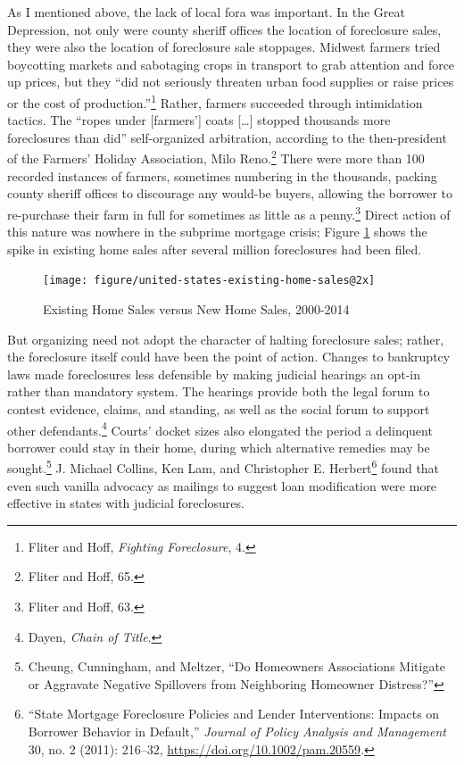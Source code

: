 \documentclass[12pt,oneside]{psthesis}
\begin{document}
As I mentioned above, the lack of local fora was important.
In the Great Depression, not only were county sheriff offices the location of foreclosure sales, they were also the location of foreclosure sale stoppages.
Midwest farmers tried boycotting markets and sabotaging crops in transport to grab attention and force up prices, but they ``did not seriously threaten urban food supplies or raise prices or the cost of production.''\footnote{Fliter and Hoff, \emph{Fighting Foreclosure}, 4.}
Rather, farmers succeeded through intimidation tactics.
The ``ropes under {[}farmers'{]} coats {[}\ldots{]} stopped thousands more foreclosures than did'' self-organized arbitration, according to the then-president of the Farmers' Holiday Association, Milo Reno.\footnote{Fliter and Hoff, 65.}
There were more than 100 recorded instances of farmers, sometimes numbering in the thousands, packing county sheriff offices to discourage any would-be buyers, allowing the borrower to re-purchase their farm in full for sometimes as little as a penny.\footnote{Fliter and Hoff, 63.}
Direct action of this nature was nowhere in the subprime mortgage crisis; Figure \ref{fig:tradingecon} shows the spike in existing home sales after several million foreclosures had been filed.
\begin{figure}

{\centering \texttt{[image: figure/united-states-existing-home-sales@2x]} 

}

\caption{Existing Home Sales versus New Home Sales, 2000-2014}\label{fig:tradingecon}
\end{figure}
But organizing need not adopt the character of halting foreclosure sales; rather, the foreclosure itself could have been the point of action.
Changes to bankruptcy laws made foreclosures less defensible by making judicial hearings an opt-in rather than mandatory system.
The hearings provide both the legal forum to contest evidence, claims, and standing, as well as the social forum to support other defendants.\footnote{Dayen, \emph{Chain of Title}.}
Courts' docket sizes also elongated the period a delinquent borrower could stay in their home, during which alternative remedies may be sought.\footnote{Cheung, Cunningham, and Meltzer, ``Do Homeowners Associations Mitigate or Aggravate Negative Spillovers from Neighboring Homeowner Distress?''}
J. Michael Collins, Ken Lam, and Christopher E. Herbert\footnote{``State Mortgage Foreclosure Policies and Lender Interventions: Impacts on Borrower Behavior in Default,'' \emph{Journal of Policy Analysis and Management} 30, no. 2 (2011): 216--32, \url{https://doi.org/10.1002/pam.20559}.} found that even such vanilla advocacy as mailings to suggest loan modification were more effective in states with judicial foreclosures.
\end{document}
